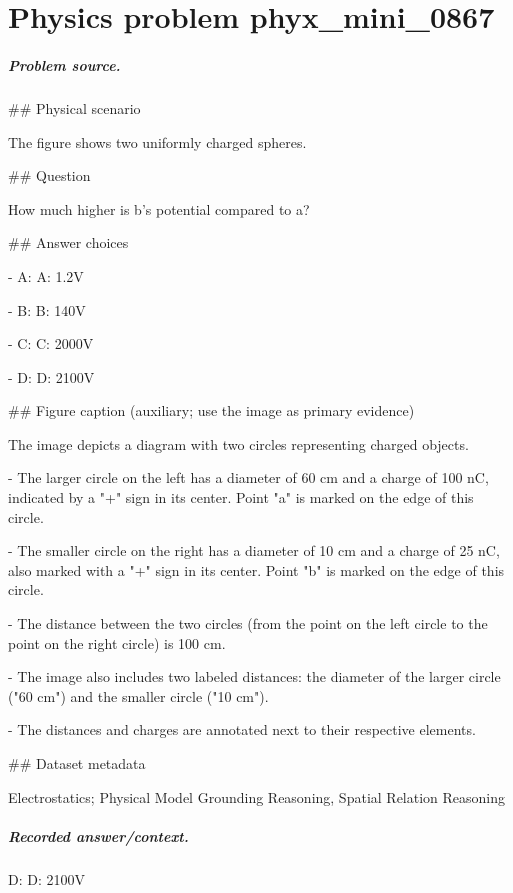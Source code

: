 
\chapter{Physics problem phyx\_mini\_0867}
\label{ch:PhyXMiniProblems_problem_phyx_mini_0867}

\paragraph{Problem source.}
\#\# Physical scenario

The figure shows two uniformly charged spheres.

\#\# Question

How much higher is b's potential compared to a?

\#\# Answer choices

- A: A: 1.2V

- B: B: 140V

- C: C: 2000V

- D: D: 2100V

\#\# Figure caption (auxiliary; use the image as primary evidence)

The image depicts a diagram with two circles representing charged objects. 

- The larger circle on the left has a diameter of 60 cm and a charge of 100 nC, indicated by a "+" sign in its center. Point "a" is marked on the edge of this circle. 

- The smaller circle on the right has a diameter of 10 cm and a charge of 25 nC, also marked with a "+" sign in its center. Point "b" is marked on the edge of this circle. 

- The distance between the two circles (from the point on the left circle to the point on the right circle) is 100 cm.

- The image also includes two labeled distances: the diameter of the larger circle ("60 cm") and the smaller circle ("10 cm"). 

- The distances and charges are annotated next to their respective elements.

\#\# Dataset metadata

Electrostatics; Physical Model Grounding Reasoning, Spatial Relation Reasoning

\paragraph{Recorded answer/context.}
D: D: 2100V

